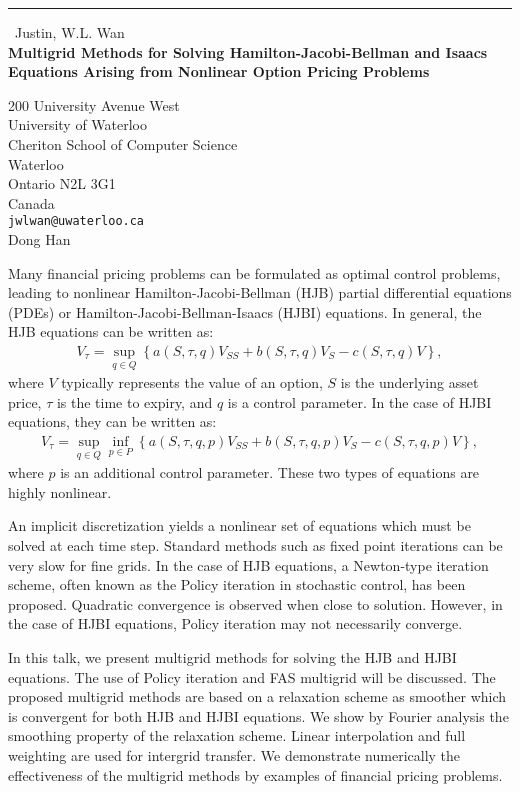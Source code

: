 \documentclass{report}
\begin{document}
\begin{center}
\rule{6in}{1pt} \
{\large Justin, W.L. Wan \\
{\bf Multigrid Methods for Solving Hamilton-Jacobi-Bellman and Isaacs Equations Arising from Nonlinear Option Pricing Problems}}

200 University Avenue West \\ University of Waterloo \\ Cheriton School of Computer Science \\ Waterloo \\ Ontario N2L 3G1 \\ Canada
\\
{\tt jwlwan@uwaterloo.ca}\\
Dong Han\end{center}

Many financial pricing problems can be formulated as optimal control
problems, leading to nonlinear Hamilton-Jacobi-Bellman (HJB) partial
differential equations (PDEs) or Hamilton-Jacobi-Bellman-Isaacs (HJBI)
equations. In general, the HJB equations can be written as:
\begin{eqnarray*}
V_\tau = \sup_{q \in Q} \left\{
a(S,\tau,q) V_{SS} + b(S,\tau,q) V_S - c(S,\tau,q) V \right\},
\end{eqnarray*}
where $V$ typically represents the value of an option, $S$ is the
underlying asset price, $\tau$ is the time to expiry, and $q$ is a
control parameter. In the case of HJBI equations, they can be written as:
\begin{eqnarray*}
V_\tau = \sup_{q \in Q} \inf_{p \in P} \left\{
a(S,\tau,q,p) V_{SS} + b(S,\tau,q,p) V_S - c(S,\tau,q,p) V \right\},
\end{eqnarray*}
where $p$ is an additional control parameter. These two types of equations
are highly nonlinear.

An implicit discretization yields a nonlinear set of equations which must
be solved at each time step. Standard methods such as fixed point
iterations can be very slow for fine grids. In the case of HJB equations,
a Newton-type iteration scheme, often known as the Policy iteration in
stochastic control, has been proposed. Quadratic convergence is observed
when close to solution. However, in the case of HJBI equations, Policy
iteration may not necessarily converge.

In this talk, we present multigrid methods for solving the HJB and HJBI
equations. The use of Policy iteration and FAS multigrid will be
discussed. The proposed multigrid methods are based on a relaxation
scheme as smoother which is convergent for both HJB and HJBI equations.
We show by Fourier analysis the smoothing property of the relaxation
scheme. Linear interpolation and full weighting are used for intergrid
transfer. We demonstrate numerically the effectiveness of the multigrid
methods by examples of financial pricing problems.
\end{document}
